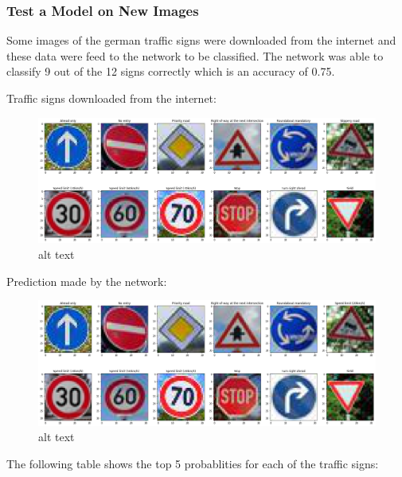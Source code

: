 \documentclass[11pt]{article}
\makeatletter
\def\maxwidth{\ifdim\Gin@nat@width>\linewidth\linewidth
    \else\Gin@nat@width\fi}
\let\Oldincludegraphics\includegraphics
\renewcommand{\includegraphics}[1]{\Oldincludegraphics[width=.8\maxwidth]{#1}}
\makeatother
\begin{document}
\subsubsection{Test a Model on New
Images}\label{test-a-model-on-new-images}

Some images of the german traffic signs were downloaded from the
internet and these data were feed to the network to be classified. The
network was able to classify 9 out of the 12 signs correctly which is an
accuracy of 0.75.

Traffic signs downloaded from the internet:

\begin{figure}
\centering
\includegraphics{./TrafficSignsInternetInput.png}
\caption{alt text}
\end{figure}

Prediction made by the network:

\begin{figure}
\centering
\includegraphics{./TrafficSignsInternetOutput.png}
\caption{alt text}
\end{figure}

The following table shows the top 5 probablities for each of the traffic
signs:
\end{document}
